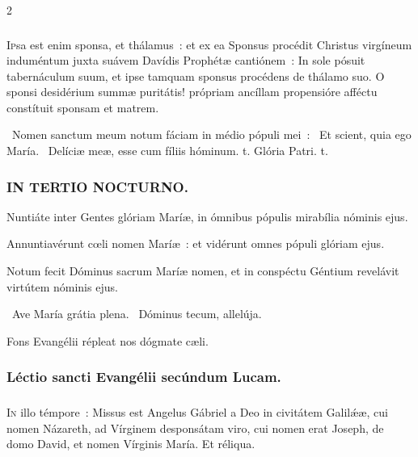 \documentclass[9pt,twoside]{extarticle}
\begin{document}
\begin{multicols}{2}
\subsubsection*{\center {}}
\lettrine{I}psa est enim sponsa, et thálamus~: et ex ea Sponsus procédit Christus virgíneum induméntum juxta suávem Davídis Prophétæ cantiónem~: In sole pósuit tabernáculum suum, et ipse tamquam sponsus procédens de thálamo suo. O sponsi desidérium summæ puritátis! própriam ancíllam propensióre afféctu constítuit sponsam et matrem.

\begin{tightlist}{}
\item {}~Nomen sanctum meum notum fáciam in médio pópuli mei~: \textred{*}~Et scient, quia ego María. ~Delíciæ meæ, esse cum fíliis hóminum. t. Glória Patri. t.
\end{tightlist}

\subsubsection*{\center \textsc{IN TERTIO NOCTURNO.}}
\begin{tightlist}{}
\item {} Nuntiáte inter Gentes glóriam Maríæ, in ómnibus pópulis mirabília nóminis ejus.
\item {} Annuntiavérunt cœli nomen Maríæ~: et vidérunt omnes pópuli glóriam ejus.
\item {} Notum fecit Dóminus sacrum Maríæ nomen, et in conspéctu Géntium revelávit virtútem nóminis ejus.
\item {}~Ave María grátia plena. ~Dóminus tecum, allelúja.
\item {\small {} Fons Evangélii répleat nos dógmate cæli.}
\end{tightlist}

\subsubsection*{\center Léctio sancti Evangélii secúndum Lucam.}
\subsubsection*{\center {}}
\lettrine{I}n illo témpore~: Missus est Angelus Gábriel a Deo in civitátem Galilǽæ, cui nomen Názareth, ad Vírginem desponsátam viro, cui nomen erat Joseph, de domo David, et nomen Vírginis María. Et réliqua.


\end{multicols}
\end{document}
